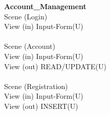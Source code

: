 \textbf{Account\_Management}\\
Scene (Login)\\
View (in)   Input-Form(U)\\
\\
Scene (Account)\\
View (in)   Input-Form(U)\\
View (out)  READ/UPDATE(U)\\
\\
Scene (Registration)\\
View (in)   Input-Form(U)\\
View (out)  INSERT(U)\\












